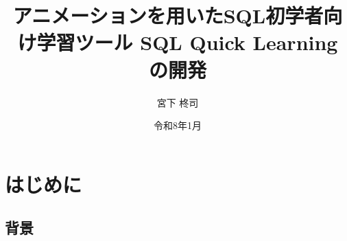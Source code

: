 \documentclass[uplatex,a4paper,12pt]{ujreport}
\title{アニメーションを用いたSQL初学者向け学習ツール SQL Quick Learning の開発}
\author{宮下 柊司}
\date{令和8年1月}
\begin{document}
\thispagestyle{empty}
\maketitle

\begin{abstract}
\end{abstract}

\tableofcontents

\setcounter{page}{0}


\chapter{はじめに}
\section{背景}
\end{document}
